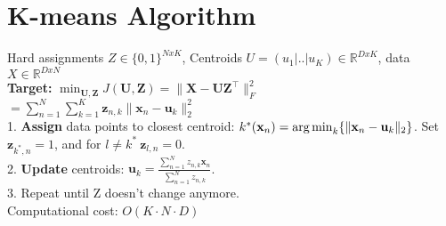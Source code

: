 \section{K-means Algorithm}
Hard assignments $Z \in \{0,1\}^{NxK}$, Centroids $U = (u_1|..|u_K) \in \mathbb{R}^{DxK}$, data $X \in \mathbb{R}^{DxN}$ \\
\textbf{Target:} $\min_{\mathbf{U}, \mathbf{Z}} J(\mathbf{U}, \mathbf{Z}) = \|\mathbf{X} - \mathbf{U} \mathbf{Z^\top}\|_F^2$\\
$= \sum_{n=1}^N \sum_{k=1}^K \mathbf{z}_{n,k} \|\mathbf{x}_n - \mathbf{u}_k\|_2^2$\\
1. \textbf{Assign} data points to closest centroid: $k^*(\mathbf{x}_n) = \operatorname*{arg\,min}_k \{ \|\mathbf{x}_n - \mathbf{u}_k\|_2 \}$. Set $\mathbf{z}_{k^*,n} = 1$, and for $ l \neq k^*~ \mathbf{z}_{l,n}=0$.\\
2. \textbf{Update} centroids: $\mathbf{u}_k = \frac{\sum_{n=1}^N z_{n,k} \mathbf{x}_n}{\sum_{n=1}^N z_{n,k}}$.\\
3. Repeat until Z doesn't change anymore.\\
Computational cost: $O(K\cdot N \cdot D)$
